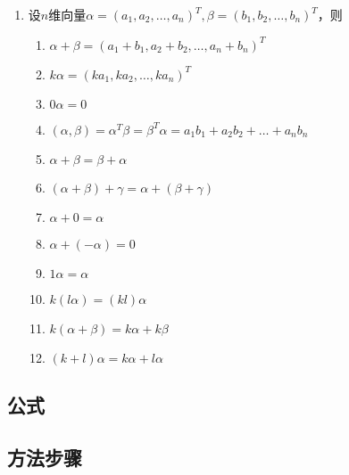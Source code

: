 \documentclass[a4paper,12pt]{article}
\begin{document}
    \begin{enumerate}
        \item 设$n$维向量$\alpha = (a_1, a_2, \dots, a_n)^T, \beta= (b_1, b_2, \dots, b_n)^T$，则
        \begin{enumerate}
            \item $\alpha + \beta = (a_1 + b_1, a_2 + b_2, \dots, a_n + b_n)^T$
            \item $k\alpha = (ka_1, ka_2, \dots, ka_n)^T$
            \item $0\alpha = 0$
            \item $(\alpha, \beta) = \alpha^T\beta = \beta^T\alpha = a_{1}b_{1} + a_{2}b_{2} + \dots + a_{n}b_{n}$
            \item $\alpha + \beta = \beta + \alpha$
            \item $(\alpha + \beta) + \gamma = \alpha + (\beta + \gamma)$
            \item $\alpha + 0 = \alpha $
            \item $\alpha + (-\alpha) = 0$
            \item $1\alpha = \alpha$
            \item $k(l\alpha) = (kl)\alpha$
            \item $k(\alpha + \beta) = k\alpha + k\beta$
            \item $(k + l)\alpha = k\alpha + l\alpha$
        \end{enumerate}
    \end{enumerate}

    \subsection{公式}

    \begin{enumerate}

    \end{enumerate}

    \subsection{方法步骤}
\end{document}
